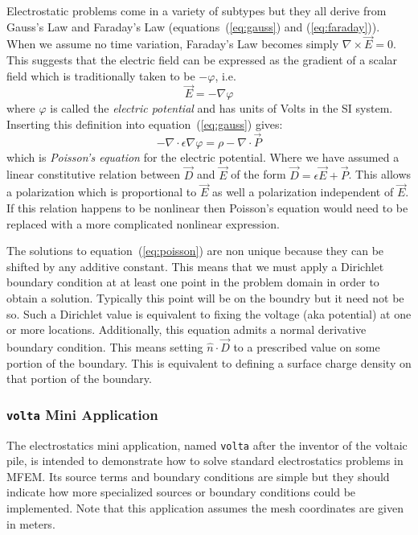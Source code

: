 \documentclass{article}
\newcommand{\refEq}[1]{(\ref{eq:#1})}
\newcommand{\Div}{\nabla\!\cdot\!}
\newcommand{\Curl}{\nabla\!\times\!}
\newcommand{\Grad}{\nabla\!}
\begin{document}
Electrostatic problems come in a variety of subtypes but they all
derive from Gauss's Law and Faraday's Law (equations~\refEq{gauss} and
\refEq{faraday}).  When we assume no time variation, Faraday's Law
becomes simply $\Curl\vec{E}=0$. This suggests that the electric field
can be expressed as the gradient of a scalar field which is
traditionally taken to be $-\varphi$, i.e.
\begin{equation}
\vec{E} = -\Grad\varphi \label{eq:gradphi}
\end{equation}
where $\varphi$ is called the {\em electric potential} and has units
of Volts in the SI system.  Inserting this definition into
equation~\refEq{gauss} gives:
\begin{equation}
-\Div\epsilon\Grad\varphi = \rho - \Div\vec{P}\label{eq:poisson}
\end{equation}
which is {\em Poisson's equation} for the electric potential.  Where
we have assumed a linear constitutive relation between $\vec{D}$ and
$\vec{E}$ of the form $\vec{D}=\epsilon\vec{E}+\vec{P}$.  This allows
a polarization which is proportional to $\vec{E}$ as well a
polarization independent of $\vec{E}$. If this relation happens to be
nonlinear then Poisson's equation would need to be replaced with a
more complicated nonlinear expression.

The solutions to equation~\refEq{poisson} are non unique because they
can be shifted by any additive constant.  This means that we must
apply a Dirichlet boundary condition at at least one point in the
problem domain in order to obtain a solution.  Typically this point
will be on the boundry but it need not be so.  Such a Dirichlet value
is equivalent to fixing the voltage (aka potential) at one or more
locations.  Additionally, this equation admits a normal derivative
boundary condition.  This means setting $\hat{n}\cdot\vec{D}$ to a
prescribed value on some portion of the boundary.  This is equivalent
to defining a surface charge density on that portion of the boundary.

\subsubsection{{\tt volta} Mini Application}

The electrostatics mini application, named {\tt volta} after the
inventor of the voltaic pile, is intended to demonstrate how to solve
standard electrostatics problems in MFEM.  Its source terms and
boundary conditions are simple but they should indicate how more
specialized sources or boundary conditions could be implemented.  Note
that this application assumes the mesh coordinates are given in
meters.
\end{document}
